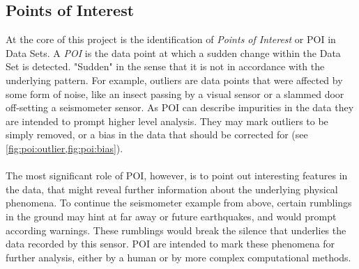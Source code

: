\documentclass[main.tex]{subfiles}
\begin{document}
    \subsection{Points of Interest}  
      \label{sec:POI}
      
      At the core of this project is the identification of \textit{Points of Interest} or POI in Data Sets. A \textit{POI} is the data point at which a sudden change within the Data Set is detected. "Sudden" in the sense that it is not in accordance with the underlying pattern. For example, outliers are data points that were affected by some form of noise, like an insect passing by a visual sensor or a slammed door off-setting a seismometer sensor. As POI can describe impurities in the data they are intended to prompt higher level analysis. They may mark outliers to be simply removed, or a bias in the data that should be corrected for (see \cref{fig:poi:outlier,fig:poi:bias}). 
      \\\\
      The most significant role of POI, however, is to point out interesting features in the data, that might reveal further information about the underlying physical phenomena. To continue the seismometer example from above, certain rumblings in the ground may hint at far away or future earthquakes, and would prompt according warnings. These rumblings would break the silence that underlies the data recorded by this sensor. POI are intended to mark these phenomena for further analysis, either by a human or by more complex computational methods.
      
\end{document}
